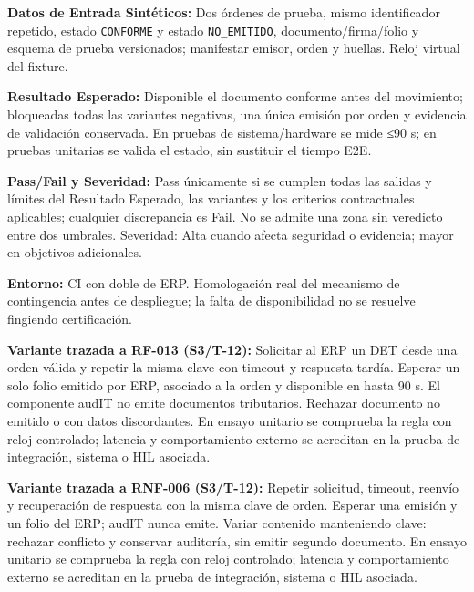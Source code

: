 \par\noindent\textbf{Datos de Entrada Sintéticos:} Dos órdenes de prueba, mismo identificador repetido, estado \texttt{C\allowbreak{}O\allowbreak{}N\allowbreak{}F\allowbreak{}O\allowbreak{}R\allowbreak{}M\allowbreak{}E\allowbreak{}} y estado \texttt{N\allowbreak{}O\allowbreak{}\_\allowbreak{}E\allowbreak{}M\allowbreak{}I\allowbreak{}T\allowbreak{}I\allowbreak{}D\allowbreak{}O\allowbreak{}}, documento/firma/folio y esquema de prueba versionados; manifestar emisor, orden y huellas. Reloj virtual del fixture.\par
\par\noindent\textbf{Resultado Esperado:} Disponible el documento conforme antes del movimiento; bloqueadas todas las variantes negativas, una única emisión por orden y evidencia de validación conservada. En pruebas de sistema/hardware se mide ≤90 s; en pruebas unitarias se valida el estado, sin sustituir el tiempo E2E.\par
\par\noindent\textbf{Pass/Fail y Severidad:} Pass únicamente si se cumplen todas las salidas y límites del Resultado Esperado, las variantes y los criterios contractuales aplicables; cualquier discrepancia es Fail. No se admite una zona sin veredicto entre dos umbrales. Severidad: Alta cuando afecta seguridad o evidencia; mayor en objetivos adicionales.\par
\par\noindent\textbf{Entorno:} CI con doble de ERP. Homologación real del mecanismo de contingencia antes de despliegue; la falta de disponibilidad no se resuelve fingiendo certificación.\par


\par\noindent\textbf{Variante trazada a RF-013 (S3/T-12):} Solicitar al ERP un DET desde una orden válida y repetir la misma clave con timeout y respuesta tardía. Esperar un solo folio emitido por ERP, asociado a la orden y disponible en hasta 90 s. El componente audIT no emite documentos tributarios. Rechazar documento no emitido o con datos discordantes. En ensayo unitario se comprueba la regla con reloj controlado; latencia y comportamiento externo se acreditan en la prueba de integración, sistema o HIL asociada.\par

\par\noindent\textbf{Variante trazada a RNF-006 (S3/T-12):} Repetir solicitud, timeout, reenvío y recuperación de respuesta con la misma clave de orden. Esperar una emisión y un folio del ERP; audIT nunca emite. Variar contenido manteniendo clave: rechazar conflicto y conservar auditoría, sin emitir segundo documento. En ensayo unitario se comprueba la regla con reloj controlado; latencia y comportamiento externo se acreditan en la prueba de integración, sistema o HIL asociada.\par
